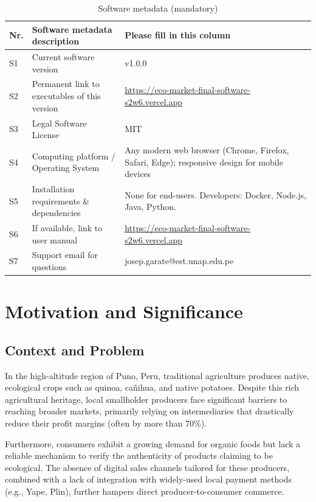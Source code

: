 \documentclass[preprint,12pt,a4paper]{elsarticle}
\begin{document}
\begin{table}[!h]
\begin{tabular}{|l|p{5.8cm}|p{6.5cm}|}
\hline
\textbf{Nr.} & \textbf{Software metadata description} & \textbf{Please fill in this column} \\
\hline
S1 & Current software version & v1.0.0 \\
\hline
S2 & Permanent link to executables of this version &
     \url{https://eco-market-final-software-s2w6.vercel.app} \\
\hline
S3 & Legal Software License & MIT \\
\hline
S4 & Computing platform / Operating System & Any modern web browser
     (Chrome, Firefox, Safari, Edge); responsive design for mobile devices \\
\hline
S5 & Installation requirements \& dependencies & None for end-users.
     Developers: Docker, Node.js, Java, Python. \\
\hline
S6 & If available, link to user manual & \url{https://eco-market-final-software-s2w6.vercel.app} \\
\hline
S7 & Support email for questions & josep.garate@est.unap.edu.pe \\
\hline
\end{tabular}
\caption{Software metadata (mandatory)}
\label{tab:software-metadata}
\end{table}

\section{Motivation and Significance}

\subsection*{Context and Problem}

In the high-altitude region of Puno, Peru, traditional agriculture produces native, ecological crops such as quinoa, cañihua, and native potatoes. Despite this rich agricultural heritage, local smallholder producers face significant barriers to reaching broader markets, primarily relying on intermediaries that drastically reduce their profit margins (often by more than 70\%). 

Furthermore, consumers exhibit a growing demand for organic foods but lack a reliable mechanism to verify the authenticity of products claiming to be ecological. The absence of digital sales channels tailored for these producers, combined with a lack of integration with widely-used local payment methods (e.g., Yape, Plin), further hampers direct producer-to-consumer commerce.
\end{document}
